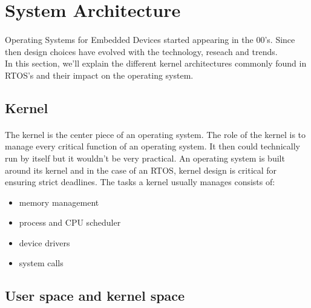 \section{System Architecture}

\paragraph{}
Operating Systems for Embedded Devices started appearing in the 00's.
Since then design choices have evolved with the technology, reseach and trends.
\\
In this section, we'll explain the different kernel architectures commonly found in RTOS's and their impact on the operating system.



\subsection{Kernel}
\paragraph{}
The kernel is the center piece of an operating system.
The role of the kernel is to manage every critical function of an operating system.
It then could technically run by itself but it wouldn't be very practical.
An operating system is built around its kernel and in the case of an RTOS, kernel design is critical for ensuring strict deadlines.
The tasks a kernel usually manages consists of:
\begin{itemize}
    \item memory management
    \item process and CPU scheduler
    \item device drivers
    \item system calls
\end{itemize}


\subsection{User space and kernel space}
